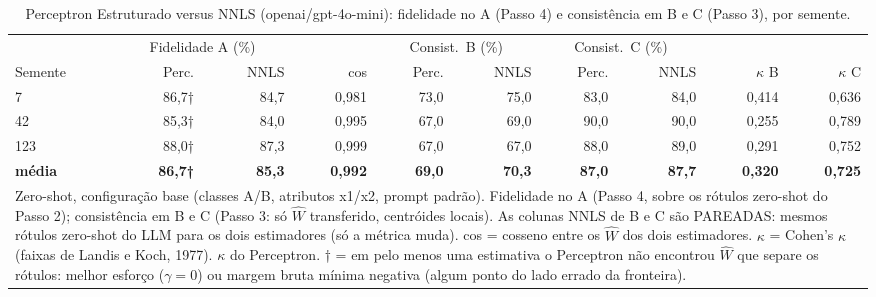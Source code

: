 \begin{table}[htbp]
\centering
\small
\caption{Perceptron Estruturado versus NNLS (openai/gpt-4o-mini): fidelidade no A (Passo 4) e consistência em B e C (Passo 3), por semente.}
\label{tab:bloco1_A_passo4_perceptron_vs_nnls_gpt4mini}
\begin{tabular}{lrrrrrrrrr}
\toprule
 & \multicolumn{2}{c}{Fidelidade A (\%)} &  & \multicolumn{2}{c}{Consist.\ B (\%)} & \multicolumn{2}{c}{Consist.\ C (\%)} &  &  \\ \cmidrule(lr){2-3} \cmidrule(lr){5-6} \cmidrule(lr){7-8}
Semente & Perc. & NNLS & cos & Perc. & NNLS & Perc. & NNLS & $\kappa$ B & $\kappa$ C \\
\midrule
7 & 86,7† & 84,7 & 0,981 & 73,0 & 75,0 & 83,0 & 84,0 & 0,414 & 0,636 \\
42 & 85,3† & 84,0 & 0,995 & 67,0 & 69,0 & 90,0 & 90,0 & 0,255 & 0,789 \\
123 & 88,0† & 87,3 & 0,999 & 67,0 & 67,0 & 88,0 & 89,0 & 0,291 & 0,752 \\
\midrule
\textbf{média} & \textbf{86,7†} & \textbf{85,3} & \textbf{0,992} & \textbf{69,0} & \textbf{70,3} & \textbf{87,0} & \textbf{87,7} & \textbf{0,320} & \textbf{0,725} \\
\bottomrule
\multicolumn{10}{p{0.95\linewidth}}{\footnotesize Zero-shot, configuração base (classes A/B, atributos x1/x2, prompt padrão). Fidelidade no A (Passo 4, sobre os rótulos zero-shot do Passo 2); consistência em B e C (Passo 3: só $\hat{W}$ transferido, centróides locais). As colunas NNLS de B e C são PAREADAS: mesmos rótulos zero-shot do LLM para os dois estimadores (só a métrica muda). cos = cosseno entre os $\hat{W}$ dos dois estimadores. $\kappa$ = Cohen's $\kappa$ (faixas de Landis e Koch, 1977). $\kappa$ do Perceptron. † = em pelo menos uma estimativa o Perceptron não encontrou $\hat{W}$ que separe os rótulos: melhor esforço ($\gamma = 0$) ou margem bruta mínima negativa (algum ponto do lado errado da fronteira).} \\
\end{tabular}
\end{table}
